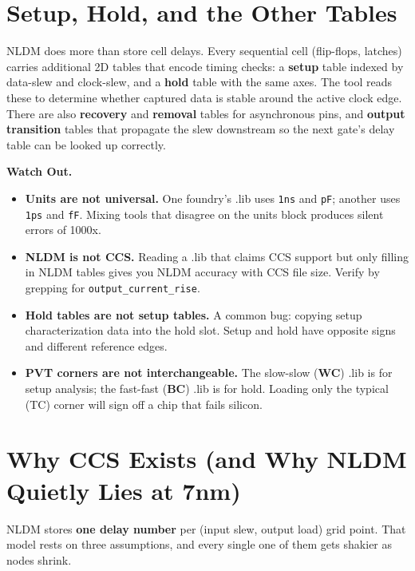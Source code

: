 \section{Setup, Hold, and the Other Tables}

NLDM does more than store cell delays. Every sequential cell (flip-flops, latches) carries additional 2D tables that encode timing checks: a \textbf{setup} table indexed by data-slew and clock-slew, and a \textbf{hold} table with the same axes. The tool reads these to determine whether captured data is stable around the active clock edge. There are also \textbf{recovery} and \textbf{removal} tables for asynchronous pins, and \textbf{output transition} tables that propagate the slew downstream so the next gate's delay table can be looked up correctly.

\begin{pitfall}
\textbf{Watch Out.}
\begin{itemize}[leftmargin=*]
  \item \textbf{Units are not universal.} One foundry's .lib uses \texttt{1ns} and \texttt{pF}; another uses \texttt{1ps} and \texttt{fF}. Mixing tools that disagree on the units block produces silent errors of 1000x.
  \item \textbf{NLDM is not CCS.} Reading a .lib that claims CCS support but only filling in NLDM tables gives you NLDM accuracy with CCS file size. Verify by grepping for \texttt{output\_current\_rise}.
  \item \textbf{Hold tables are not setup tables.} A common bug: copying setup characterization data into the hold slot. Setup and hold have opposite signs and different reference edges.
  \item \textbf{PVT corners are not interchangeable.} The slow-slow (\textbf{WC}) .lib is for setup analysis; the fast-fast (\textbf{BC}) .lib is for hold. Loading only the typical (TC) corner will sign off a chip that fails silicon.
\end{itemize}
\end{pitfall}

\section{Why CCS Exists (and Why NLDM Quietly Lies at 7nm)}

NLDM stores \textbf{one delay number} per (input slew, output load) grid point. That model rests on three assumptions, and every single one of them gets shakier as nodes shrink.

